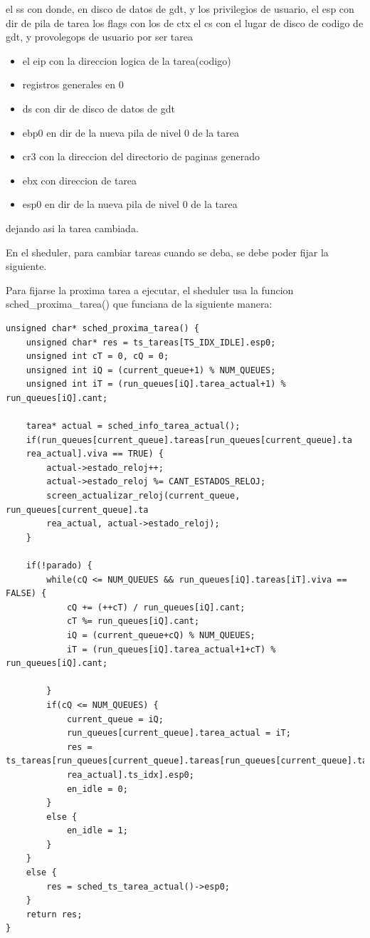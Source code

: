 \documentclass[a4paper]{article}
\newenvironment{codesnippet}{%
	\begin{Sbox}\begin{minipage}{\textwidth}\sffamily\small}%
	{\end{minipage}\end{Sbox}%
		\begin{center}%
		\vspace{-0.4cm}\colorbox{litegrey}{\TheSbox}\end{center}\vspace{0.3cm}}
\begin{document}
el ss con donde, en disco de datos de gdt, y los privilegios de usuario, 
el esp con dir de pila de tarea
los flags con los de ctx
el cs con el lugar de disco de codigo de gdt, y provolegops de usuario por ser tarea
\begin{itemize}


\item el eip con la direccion logica de la tarea(codigo)
\item registros generales en 0
\item ds con dir de disco de datos de gdt
\item ebp0  en dir de la nueva pila de nivel 0 de la tarea
\item cr3 con la direccion del directorio de paginas generado
\item ebx con direccion de tarea
\item esp0  en dir de la nueva pila de nivel 0 de la tarea

\end{itemize}

dejando asi la tarea cambiada.


En el sheduler, para cambiar tareas cuando se deba, se debe poder fijar la siguiente.

Para fijarse la proxima tarea a ejecutar, el sheduler usa la funcion sched_proxima_tarea() que funciana de la siguiente  manera:


\begin{codesnippet}
\begin{verbatim}		
unsigned char* sched_proxima_tarea() {
    unsigned char* res = ts_tareas[TS_IDX_IDLE].esp0;
    unsigned int cT = 0, cQ = 0;
    unsigned int iQ = (current_queue+1) % NUM_QUEUES;
    unsigned int iT = (run_queues[iQ].tarea_actual+1) % run_queues[iQ].cant;

    tarea* actual = sched_info_tarea_actual();
    if(run_queues[current_queue].tareas[run_queues[current_queue].ta
    rea_actual].viva == TRUE) {
        actual->estado_reloj++;
        actual->estado_reloj %= CANT_ESTADOS_RELOJ;
        screen_actualizar_reloj(current_queue, run_queues[current_queue].ta
        rea_actual, actual->estado_reloj);
    }

    if(!parado) {
        while(cQ <= NUM_QUEUES && run_queues[iQ].tareas[iT].viva == FALSE) {
            cQ += (++cT) / run_queues[iQ].cant;
            cT %= run_queues[iQ].cant;
            iQ = (current_queue+cQ) % NUM_QUEUES;
            iT = (run_queues[iQ].tarea_actual+1+cT) % run_queues[iQ].cant;

        }
        if(cQ <= NUM_QUEUES) {
            current_queue = iQ;
            run_queues[current_queue].tarea_actual = iT;
            res = ts_tareas[run_queues[current_queue].tareas[run_queues[current_queue].ta
            rea_actual].ts_idx].esp0;
            en_idle = 0;
        }
        else {
            en_idle = 1;
        }
    }
    else {
        res = sched_ts_tarea_actual()->esp0;
    }
    return res;
} 
\end{verbatim}
\end{codesnippet}
\end{document}
